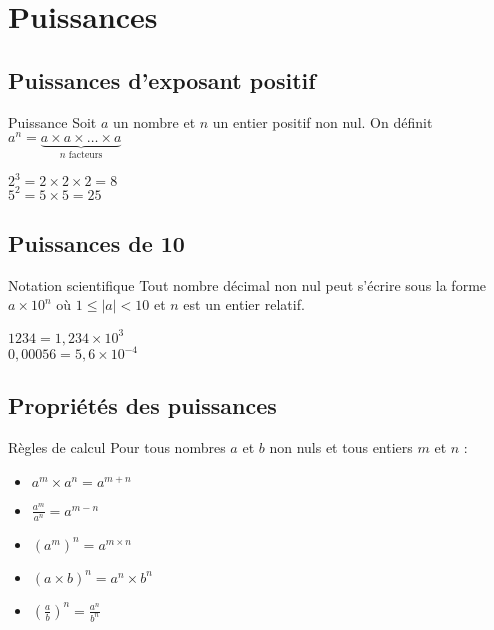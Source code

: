 \chapter{Puissances}

\section{Puissances d'exposant positif}
\begin{definition}{Puissance}
Soit $a$ un nombre et $n$ un entier positif non nul. On définit $a^n = \underbrace{a \times a \times \ldots \times a}_{n \text{ facteurs}}$
\end{definition}

\begin{exemple}
$2^3 = 2 \times 2 \times 2 = 8$\\
$5^2 = 5 \times 5 = 25$
\end{exemple}

\section{Puissances de 10}
\begin{propriete}{Notation scientifique}
Tout nombre décimal non nul peut s'écrire sous la forme $a \times 10^n$ où $1 \leq |a| < 10$ et $n$ est un entier relatif.
\end{propriete}

\begin{exemple}
$1234 = 1,234 \times 10^3$\\
$0,00056 = 5,6 \times 10^{-4}$
\end{exemple}

\section{Propriétés des puissances}
\begin{propriete}{Règles de calcul}
Pour tous nombres $a$ et $b$ non nuls et tous entiers $m$ et $n$ :
\begin{itemize}
    \item $a^m \times a^n = a^{m+n}$
    \item $\frac{a^m}{a^n} = a^{m-n}$
    \item $(a^m)^n = a^{m \times n}$
    \item $(a \times b)^n = a^n \times b^n$
    \item $\left(\frac{a}{b}\right)^n = \frac{a^n}{b^n}$
\end{itemize}
\end{propriete}

